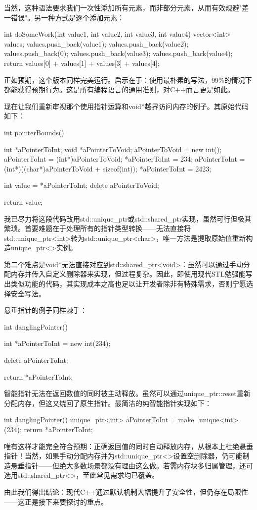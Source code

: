 当然，这种语法要求我们一次性添加所有元素，而非部分元素，从而有效规避"差一错误"。另一种方式是逐个添加元素：

\begin{cpp}
int doSomeWork(int value1, int value2, int value3, int value4) {
  vector<int> values;
  values.push_back(value1);
  values.push_back(value2);
  values.push_back(0);
  values.push_back(value3);
  values.push_back(value4);
  return values[0] + values[1] + values[3] + values[4];
}
\end{cpp}

正如预期，这个版本同样完美运行。启示在于：使用最朴素的写法，99\%的情况下都能获得预期行为。这是所有编程语言的通用准则，对C++而言更是如此。

现在让我们重新审视那个使用指针运算和void*越界访问内存的例子。其原始代码如下：

\begin{cpp}
int pointerBounds() {
  int *aPointerToInt;
  void *aPointerToVoid;
  aPointerToVoid = new int();
  aPointerToInt = (int*)aPointerToVoid;
  *aPointerToInt = 234;
  aPointerToInt = (int*)((char*)aPointerToVoid + sizeof(int));
  *aPointerToInt = 2423;

  int value = *aPointerToInt;
  delete aPointerToVoid;

  return value;
}
\end{cpp}

我已尽力将这段代码改用std::unique\_ptr或std::shared\_ptr实现，虽然可行但极其繁琐。首要难题在于处理所有的指针类型转换——无法直接将std::unique\_ptr<int>转为std::unique\_ptr<char>，唯一方法是提取原始值重新构造unique\_ptr<>实例。

第二个难点是void*无法直接对应到std::shared\_ptr<void>：虽然可以通过手动分配内存并传入自定义删除器来实现，但过程复杂。因此，即使用现代STL勉强能写出类似功能的代码，其实现成本之高也足以让开发者除非有特殊需求，否则宁愿选择安全写法。

悬垂指针的例子同样棘手：

\begin{cpp}
int danglingPointer() {
  int *aPointerToInt = new int(234);

  delete aPointerToInt;

  return *aPointerToInt;
}
\end{cpp}

智能指针无法在返回数值的同时被主动释放。虽然可以通过unique\_ptr::reset重新分配内存，但这又绕回了原生指针。最简洁的纯智能指针实现如下：

\begin{cpp}
int danglingPointer() {
  unique_ptr<int> aPointerToInt = make_unique<int>(234);
  return *aPointerToInt;
}
\end{cpp}

唯有这样才能完全符合预期：正确返回值的同时自动释放内存，从根本上杜绝悬垂指针！当然，如果手动分配内存并为std::unique\_ptr<>设置空删除器，仍可能制造悬垂指针——但绝大多数场景都没有理由这么做。若需内存块多归属管理，还可选用std::shared\_ptr<>，至此常见需求均已覆盖。

由此我们得出结论：现代C++通过默认机制大幅提升了安全性，但仍存在局限性——这正是接下来要探讨的重点。
